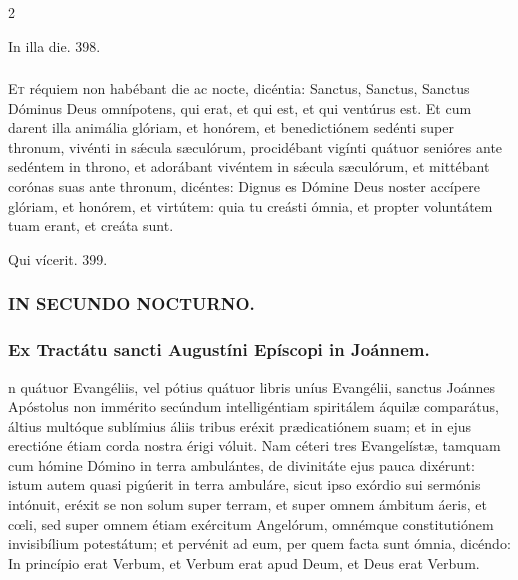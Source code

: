 \documentclass[9pt,twoside]{extarticle}
\begin{document}
\begin{multicols}{2}
\begin{tightlist}{}
\item {} In illa die. 398.
\end{tightlist}

\subsubsection*{\center {}}
\lettrine{E}t réquiem non habébant die ac nocte, dicéntia: Sanctus, Sanctus, Sanctus Dóminus Deus omnípotens, qui erat, et qui est, et qui ventúrus est.
Et cum darent illa animália glóriam, et honórem, et benedictiónem sedénti super thronum, vivénti in sǽcula sæculórum,
procidébant vigínti quátuor senióres ante sedéntem in throno, et adorábant vivéntem in sǽcula sæculórum, et mittébant corónas suas ante thronum, dicéntes:
Dignus es Dómine Deus noster accípere glóriam, et honórem, et virtútem: quia tu creásti ómnia, et propter voluntátem tuam erant, et creáta sunt.

\begin{tightlist}{}
\item {} Qui vícerit. 399.
\end{tightlist}

\subsubsection*{\center \textsc{IN SECUNDO NOCTURNO.}}
\subsubsection*{\center Ex Tractátu sancti Augustíni Epíscopi in Joánnem.}
\begin{center}\end{center}
n quátuor Evangéliis, vel pótius quátuor libris uníus Evangélii, sanctus Joánnes Apóstolus non immérito secúndum intelligéntiam spiritálem áquilæ comparátus, áltius multóque sublímius áliis tribus eréxit prædicatiónem suam; et in ejus erectióne étiam corda nostra érigi vóluit. Nam céteri tres Evangelístæ, tamquam cum hómine Dómino in terra ambulántes, de divinitáte ejus pauca dixérunt: istum autem quasi pigúerit in terra ambuláre, sicut ipso exórdio sui sermónis intónuit, eréxit se non solum super terram, et super omnem ámbitum áeris, et cœli, sed super omnem étiam exércitum Angelórum, omnémque constitutiónem invisibílium potestátum; et pervénit ad eum, per quem facta sunt ómnia, dicéndo: In princípio erat Verbum, et Verbum erat apud Deum, et Deus erat Verbum.


\end{multicols}
\end{document}
